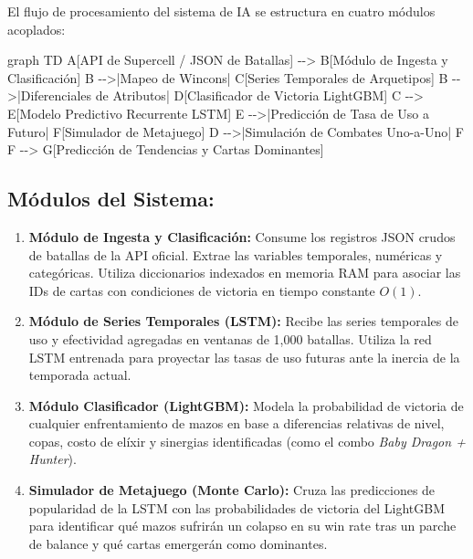 \documentclass[
  spanish,
  12pt,
]{report}
\newenvironment{Shaded}{\begin{snugshade}}{\end{snugshade}}
\newcommand{\NormalTok}[1]{\textcolor[rgb]{0.00,0.23,0.31}{#1}}
\providecommand{\tightlist}{%
  \setlength{\itemsep}{0pt}\setlength{\parskip}{0pt}}
\begin{document}
El flujo de procesamiento del sistema de IA se estructura en cuatro
módulos acoplados:

\begin{Shaded}
\begin{Highlighting}[]
\NormalTok{graph TD}
\NormalTok{    A[API de Supercell / JSON de Batallas] {-}{-}\textgreater{} B[Módulo de Ingesta y Clasificación]}
\NormalTok{    B {-}{-}\textgreater{}|Mapeo de Wincons| C[Series Temporales de Arquetipos]}
\NormalTok{    B {-}{-}\textgreater{}|Diferenciales de Atributos| D[Clasificador de Victoria LightGBM]}
\NormalTok{    C {-}{-}\textgreater{} E[Modelo Predictivo Recurrente LSTM]}
\NormalTok{    E {-}{-}\textgreater{}|Predicción de Tasa de Uso a Futuro| F[Simulador de Metajuego]}
\NormalTok{    D {-}{-}\textgreater{}|Simulación de Combates Uno{-}a{-}Uno| F}
\NormalTok{    F {-}{-}\textgreater{} G[Predicción de Tendencias y Cartas Dominantes]}
\end{Highlighting}
\end{Shaded}

\subsection{Módulos del Sistema:}\label{muxf3dulos-del-sistema}

\begin{enumerate}
\def\labelenumi{\arabic{enumi}.}
\tightlist
\item
  \textbf{Módulo de Ingesta y Clasificación:} Consume los registros JSON
  crudos de batallas de la API oficial. Extrae las variables temporales,
  numéricas y categóricas. Utiliza diccionarios indexados en memoria RAM
  para asociar las IDs de cartas con condiciones de victoria en tiempo
  constante \(O(1)\).
\item
  \textbf{Módulo de Series Temporales (LSTM):} Recibe las series
  temporales de uso y efectividad agregadas en ventanas de 1,000
  batallas. Utiliza la red LSTM entrenada para proyectar las tasas de
  uso futuras ante la inercia de la temporada actual.
\item
  \textbf{Módulo Clasificador (LightGBM):} Modela la probabilidad de
  victoria de cualquier enfrentamiento de mazos en base a diferencias
  relativas de nivel, copas, costo de elíxir y sinergias identificadas
  (como el combo \emph{Baby Dragon + Hunter}).
\item
  \textbf{Simulador de Metajuego (Monte Carlo):} Cruza las predicciones
  de popularidad de la LSTM con las probabilidades de victoria del
  LightGBM para identificar qué mazos sufrirán un colapso en su win rate
  tras un parche de balance y qué cartas emergerán como dominantes.
\end{enumerate}
\end{document}
